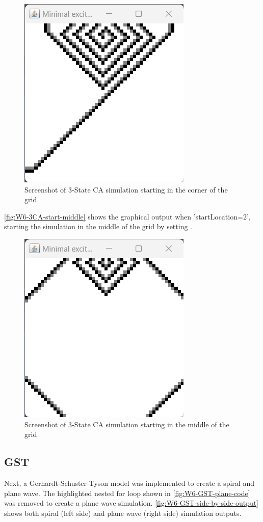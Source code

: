 \begin{figure}[H] 
    \centering
    \includegraphics[width=0.49\columnwidth]{Figures/Week 6/3stateCA-CORNER-output.png}
    \caption{Screenshot of 3-State CA simulation starting in the corner of the grid}
    \label{fig:W6-3CA-start-corner}
\end{figure}

\autoref{fig:W6-3CA-start-middle} shows the graphical output when 'startLocation=2', starting the simulation in the middle of the grid by setting . 
\begin{figure}[H] 
    \centering
    \includegraphics[width=0.49\columnwidth]{Figures/Week 6/3stateCA-MIDDLE-output.png}
    \caption{Screenshot of 3-State CA simulation starting in the middle of the grid}
    \label{fig:W6-3CA-start-middle}
\end{figure}
\newpage
\subsection{GST}
Next, a Gerhardt-Schuster-Tyson model was implemented to create a spiral and plane wave. The highlighted nested for loop shown in \autoref{fig:W6-GST-plane-code} was removed to create a plane wave simulation. \autoref{fig:W6-GST-side-by-side-output} shows both spiral (left side) and plane wave (right side) simulation outputs.

